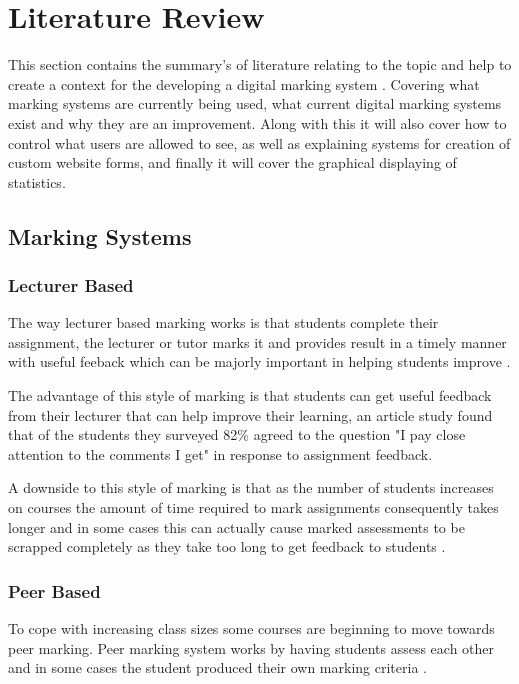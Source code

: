 \documentclass[12pt]{article}  %
\begin{document}


\newpage
\section{Literature Review}
This section contains the summary's of literature relating to the topic and help to create a context for the developing a digital marking system . Covering what marking systems are currently being used, what current digital marking systems exist and why they are an improvement. Along with this it will also cover how to control what users are allowed to see, as well as explaining systems for creation of custom website forms, and finally it will cover the graphical displaying of statistics.


\subsection{Marking Systems}

\subsubsection{Lecturer Based}
The way lecturer based marking works is that students complete their assignment, the lecturer or tutor marks it and provides result in a timely manner with useful feeback which can be majorly important in helping students improve \cite{tang_investigating_2011}.
 
The advantage of this style of marking is that students can get useful feedback from their lecturer that can help improve their learning, an article study \cite{higgins_conscientious_2002} found that of the students they surveyed 82\% agreed to the question "I pay close attention to the comments I get" in response to assignment feedback.

A downside to this style of marking is that as the number of students increases on courses the amount of time required to mark assignments consequently takes longer and in some cases this can actually cause marked assessments to be scrapped completely as they take too long to get feedback to students \cite{brown_assessment_1999}. 


\subsubsection{Peer Based}
To cope with increasing class sizes some courses are beginning to move towards peer marking. Peer marking system works by having students assess each other and in some cases  the student produced their own marking criteria \cite{orsmond_use_2000}. 
\end{document}
